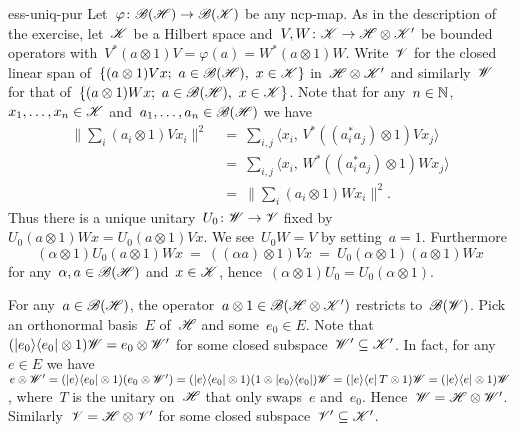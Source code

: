 \documentclass[b5page]{book}
\begin{document}
\begin{solution}{ess-uniq-pur}%
Let~$\varphi\colon \mathscr{B}(\mathscr{H}) \to \mathscr{B}(\mathscr{K})$ be any ncp-map.
As in the description of the exercise,
    let~$\mathscr{K}$ be a Hilbert space
    and~$V,W\colon \mathscr{K} \to \mathscr{H} \otimes \mathscr{K}'$
    be bounded operators
    with~$V^* (a \otimes 1) V = \varphi(a) = W^* (a\otimes 1) W$.
Write~$\mathscr{V}$ for the closed linear span
    of~$\{(a \otimes 1) V x; \ a \in \mathscr{B}(\mathscr{H}),\ x \in \mathscr{K}\}$
        in~$\mathscr{H}\otimes \mathscr{K}'$
and similarly~$\mathscr{W}$ for that
    of~$\{(a \otimes 1) W x; \ a \in \mathscr{B}(\mathscr{H}),\ x \in \mathscr{K}\}$.
Note that for any~$n\in \mathbb{N}$, ~$x_1,\ldots, x_n \in \mathscr{K}$
    and~$a_1, \ldots, a_n \in \mathscr{B}(\mathscr{H})$ we have
\begin{align*}
    \bigl\| \sum_i (a_i\otimes1) V x_i \bigr\|^2
    &\ = \ 
     \sum_{i,j} \langle x_i,\, V^* ((a_i^*a_j) \otimes 1) V x_j\rangle \\
    &\ = \ 
     \sum_{i,j} \langle x_i,\, W^* ((a_i^*a_j) \otimes 1) W x_j\rangle \\
     &\ = \ 
    \bigl\| \sum_i (a_i\otimes1) W x_i \bigr\|^2.
\end{align*}
Thus there is a unique unitary~$U_0\colon \mathscr{W} \to \mathscr{V}$
    fixed by~$U_0 (a \otimes 1) W x = U_0 (a \otimes 1) V x$.
We see~$U_0 W = V$ by setting~$a=1$.
Furthermore
    \begin{equation*}
        (\alpha \otimes 1) U_0 (a \otimes 1) W x
        \ = \ ((\alpha a)  \otimes 1) V x
        \ = \ U_0 (\alpha  \otimes 1 )(a  \otimes 1) W x
    \end{equation*}
    for any~$\alpha,a \in \mathscr{B}(\mathscr{H})$ and~$x \in \mathscr{K}$,
    hence~$(\alpha \otimes 1) U_0 = U_0 (\alpha \otimes 1)$.

For any~$a \in \mathscr{B}(\mathscr{H})$,
    the operator~$a \otimes 1 \in \mathscr{B}(\mathscr{H} \otimes \mathscr{K}')$
    restricts to~$\mathscr{B}(\mathscr{W})$.
Pick an orthonormal basis~$E$ of~$\mathscr{H}$
    and some~$e_0 \in E$.
    Note that~$(\left|e_0\right>\!\left<e_0\right| \otimes 1) \mathscr{W} = e_0 \otimes \mathscr{W}'$
    for some closed subspace~$\mathscr{W}' \subseteq \mathscr{K}'$.
In fact, for any~$e \in E$
    we have~$e \otimes \mathscr{W}'
    = (\left|e\right>\!\left<e_0\right| \otimes 1) (e_0 \otimes \mathscr{W}')
    = (\left|e\right>\!\left<e_0\right|\otimes 1)  (1 \otimes \left|e_0\right>\!\left<e_0\right|) \mathscr{W}
    = (\left|e\right>\!\left<e\right| T \otimes 1)  \mathscr{W} = (\left|e\right>\!\left<e\right| \otimes 1) \mathscr{W}$,
    where~$T$ is the unitary on~$\mathscr{H}$ that only swaps~$e$ and~$e_0$.
Hence~$\mathscr{W} = \mathscr{H} \otimes \mathscr{W}'$.
Similarly~$\mathscr{V} = \mathscr{H} \otimes \mathscr{V}'$
    for some closed subspace~$\mathscr{V}' \subseteq \mathscr{K}'$.


\end{solution}
\end{document}
